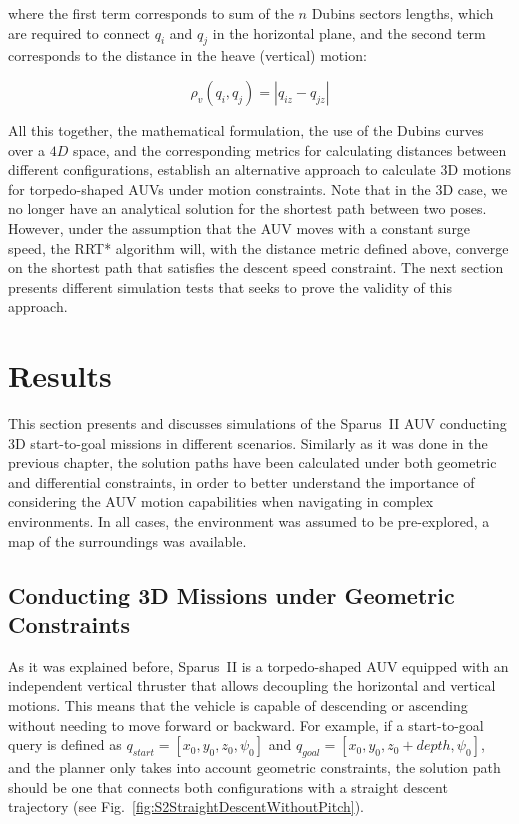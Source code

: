 \noindent where the first term corresponds to sum of the $n$ Dubins sectors
lengths, which are required to connect $q_i$ and $q_j$ in the horizontal plane,
and the second term corresponds to the distance in the heave (vertical) motion:

\begin{equation}
	\rho_v\left( q_i, q_j \right) = \left | q_{iz} - q_{jz} \right|
\end{equation}

All this together, \ie the mathematical formulation, the use of the Dubins
curves over a $4D$ space, and the corresponding metrics for calculating
distances between different configurations, establish an alternative approach to
calculate \ac{3D} motions for torpedo-shaped \acp{AUV} under motion constraints.
Note that in the \ac{3D} case, we no longer have an analytical solution for the
shortest path between two poses. However, under the assumption that the \ac{AUV}
moves with a constant surge speed, the \ac{RRT*} algorithm will, with the
distance metric defined above, converge on the shortest path that satisfies the
descent speed constraint. The next section presents different simulation tests
that seeks to prove the validity of this approach.

\section{Results}

This section presents and discusses simulations of the Sparus~II \ac{AUV}
conducting \ac{3D} start-to-goal missions in different scenarios. Similarly as
it was done in the previous chapter, the solution paths have been calculated
under both geometric and differential constraints, in order to better understand
the importance of considering the \ac{AUV} motion capabilities when navigating
in complex environments. In all cases, the environment was assumed to be
pre-explored, \ie a map of the surroundings was available.

\subsection{Conducting 3D Missions under Geometric Constraints}

As it was explained before, Sparus~II is a torpedo-shaped \ac{AUV} equipped with
an independent vertical thruster that allows decoupling the horizontal and
vertical motions. This means that the vehicle is capable of descending or
ascending without needing to move forward or backward. For example, if a
start-to-goal query is defined as $q_{start} = [x_0, y_0, z_0, \psi_0]$ and
$q_{goal} = [x_0, y_0, z_0+depth, \psi_0]$, and the planner only takes into
account geometric constraints, the solution path should be one that connects
both configurations with a straight descent trajectory (see
Fig.~\ref{fig:S2StraightDescentWithoutPitch}).

